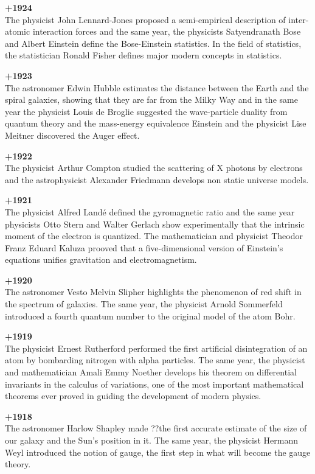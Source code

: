 \textbf{+1924}\\
The physicist John Lennard-Jones proposed a semi-empirical description of inter-atomic interaction forces and the same year, the physicists Satyendranath Bose and Albert Einstein define the Bose-Einstein statistics. In the field of statistics, the statistician Ronald Fisher defines major modern concepts in statistics.

\textbf{+1923}\\
The astronomer Edwin Hubble estimates the distance between the Earth and the spiral galaxies, showing that they are far from the Milky Way and in the same year the physicist Louis de Broglie suggested the wave-particle duality from quantum theory and the mass-energy equivalence Einstein and the physicist Lise Meitner discovered the Auger effect.

\textbf{+1922}\\
The physicist Arthur Compton studied the scattering of X photons by electrons and the astrophysicist Alexander Friedmann develops non static universe models.

\textbf{+1921}\\
The physicist Alfred Landé defined the gyromagnetic ratio and the same year physicists Otto Stern and Walter Gerlach show experimentally that the intrinsic moment of the electron is quantized. The mathematician and physicist Theodor Franz Eduard Kaluza prooved that a five-dimensional version of Einstein's equations unifies gravitation and electromagnetism.

\textbf{+1920}\\
The astronomer Vesto Melvin Slipher highlights the phenomenon of red shift in the spectrum of galaxies. The same year, the physicist Arnold Sommerfeld introduced a fourth quantum number to the original model of the atom Bohr.

\textbf{+1919}\\
The physicist Ernest Rutherford performed the first artificial disintegration of an atom by bombarding nitrogen with alpha particles. The same year, the physicist and mathematician Amali Emmy Noether develops his theorem on differential invariants in the calculus of variations, one of the most important mathematical theorems ever proved in guiding the development of modern physics.

\textbf{+1918}\\
The astronomer Harlow Shapley made ??the first accurate estimate of the size of our galaxy and the Sun's position in it. The same year, the physicist Hermann Weyl introduced the notion of gauge, the first step in what will become the gauge theory.


